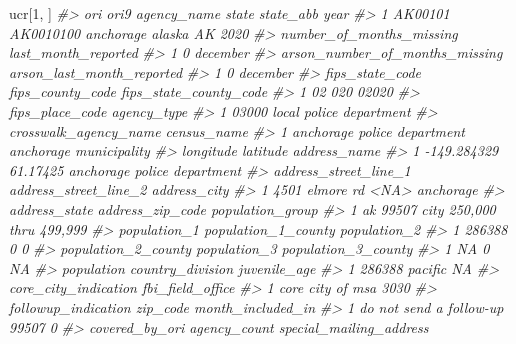 \documentclass[
]{krantz}
\makeatletter
\newenvironment{Shaded}{\begin{snugshade}}{\end{snugshade}}
\newcommand{\CommentTok}[1]{\textcolor[rgb]{0.37,0.37,0.37}{\textit{#1}}}
\newcommand{\DecValTok}[1]{\textcolor[rgb]{0.06,0.06,0.06}{#1}}
\newcommand{\NormalTok}[1]{#1}
\newenvironment{kframe}{%
\medskip{}
\setlength{\fboxsep}{.8em}
 \def\at@end@of@kframe{}%
 \ifinner\ifhmode%
  \def\at@end@of@kframe{\end{minipage}}%
  \begin{minipage}{\columnwidth}%
 \fi\fi%
 \def\FrameCommand##1{\hskip\@totalleftmargin \hskip-\fboxsep
 \colorbox{shadecolor}{##1}\hskip-\fboxsep
     \hskip-\linewidth \hskip-\@totalleftmargin \hskip\columnwidth}%
 \MakeFramed {\advance\hsize-\width
   \@totalleftmargin\z@ \linewidth\hsize
   \@setminipage}}%
 {\par\unskip\endMakeFramed%
 \at@end@of@kframe}
\renewenvironment{Shaded}{\begin{kframe}}{\end{kframe}}
\makeatother
\begin{document}
\begin{Shaded}
\begin{Highlighting}[]
\NormalTok{ucr[}\DecValTok{1}\NormalTok{, ]}
\CommentTok{\#\textgreater{}       ori      ori9 agency\_name  state state\_abb year}
\CommentTok{\#\textgreater{} 1 AK00101 AK0010100   anchorage alaska        AK 2020}
\CommentTok{\#\textgreater{}   number\_of\_months\_missing last\_month\_reported}
\CommentTok{\#\textgreater{} 1                        0            december}
\CommentTok{\#\textgreater{}   arson\_number\_of\_months\_missing arson\_last\_month\_reported}
\CommentTok{\#\textgreater{} 1                              0                  december}
\CommentTok{\#\textgreater{}   fips\_state\_code fips\_county\_code fips\_state\_county\_code}
\CommentTok{\#\textgreater{} 1              02              020                  02020}
\CommentTok{\#\textgreater{}   fips\_place\_code             agency\_type}
\CommentTok{\#\textgreater{} 1           03000 local police department}
\CommentTok{\#\textgreater{}         crosswalk\_agency\_name            census\_name}
\CommentTok{\#\textgreater{} 1 anchorage police department anchorage municipality}
\CommentTok{\#\textgreater{}     longitude latitude                address\_name}
\CommentTok{\#\textgreater{} 1 {-}149.284329 61.17425 anchorage police department}
\CommentTok{\#\textgreater{}   address\_street\_line\_1 address\_street\_line\_2 address\_city}
\CommentTok{\#\textgreater{} 1        4501 elmore rd                  \textless{}NA\textgreater{}    anchorage}
\CommentTok{\#\textgreater{}   address\_state address\_zip\_code          population\_group}
\CommentTok{\#\textgreater{} 1            ak            99507 city 250,000 thru 499,999}
\CommentTok{\#\textgreater{}   population\_1 population\_1\_county population\_2}
\CommentTok{\#\textgreater{} 1       286388                   0            0}
\CommentTok{\#\textgreater{}   population\_2\_county population\_3 population\_3\_county}
\CommentTok{\#\textgreater{} 1                  NA            0                  NA}
\CommentTok{\#\textgreater{}   population country\_division juvenile\_age}
\CommentTok{\#\textgreater{} 1     286388          pacific           NA}
\CommentTok{\#\textgreater{}   core\_city\_indication fbi\_field\_office}
\CommentTok{\#\textgreater{} 1     core city of msa             3030}
\CommentTok{\#\textgreater{}       followup\_indication zip\_code month\_included\_in}
\CommentTok{\#\textgreater{} 1 do not send a follow{-}up    99507                 0}
\CommentTok{\#\textgreater{}   covered\_by\_ori agency\_count       special\_mailing\_address}

\end{Highlighting}
\end{Shaded}
\end{document}
